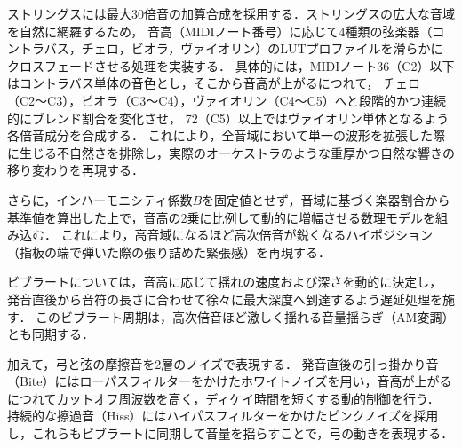 \documentclass[lualatex,book,paper=a4paper,jafontsize=11.5pt,jafontscale=1.05]{jlreq}
\begin{document}
ストリングスには最大30倍音の加算合成を採用する．ストリングスの広大な音域を自然に網羅するため，
音高（MIDIノート番号）に応じて4種類の弦楽器（コントラバス，チェロ，ビオラ，ヴァイオリン）のLUTプロファイルを滑らかにクロスフェードさせる処理を実装する．
具体的には，MIDIノート36（C2）以下はコントラバス単体の音色とし，そこから音高が上がるにつれて，
チェロ（C2〜C3），ビオラ（C3〜C4），ヴァイオリン（C4〜C5）へと段階的かつ連続的にブレンド割合を変化させ，
72（C5）以上ではヴァイオリン単体となるよう各倍音成分を合成する．
これにより，全音域において単一の波形を拡張した際に生じる不自然さを排除し，実際のオーケストラのような重厚かつ自然な響きの移り変わりを再現する．

さらに，インハーモニシティ係数$B$を固定値とせず，音域に基づく楽器割合から基準値を算出した上で，音高の2乗に比例して動的に増幅させる数理モデルを組み込む．
これにより，高音域になるほど高次倍音が鋭くなるハイポジション（指板の端で弾いた際の張り詰めた緊張感）を再現する．

ビブラートについては，音高に応じて揺れの速度および深さを動的に決定し，
発音直後から音符の長さに合わせて徐々に最大深度へ到達するよう遅延処理を施す．
このビブラート周期は，高次倍音ほど激しく揺れる音量揺らぎ（AM変調）とも同期する．

加えて，弓と弦の摩擦音を2層のノイズで表現する．
発音直後の引っ掛かり音（Bite）にはローパスフィルターをかけたホワイトノイズを用い，音高が上がるにつれてカットオフ周波数を高く，ディケイ時間を短くする動的制御を行う．
持続的な擦過音（Hiss）にはハイパスフィルターをかけたピンクノイズを採用し，これらもビブラートに同期して音量を揺らすことで，弓の動きを表現する．
\end{document}
